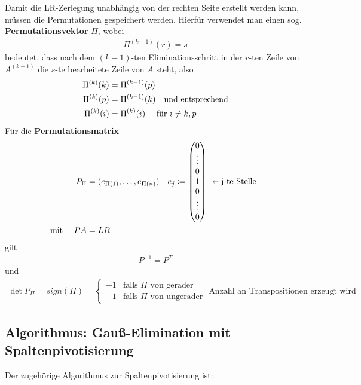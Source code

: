 \documentclass[ngerman,fontsize=11pt, paper=a4, parskip=half, titlepage=true, toc=bib]{scrbook}
\theoremstyle{definition}
\theoremstyle{plain}
\newcommand{\subsectione}[1]{\addtocounter{Def}{1}\subsection{#1}}
\begin{document}
Damit die LR-Zerlegung unabhängig von der rechten Seite erstellt werden kann, müssen die Permutationen gespeichert werden.
Hierfür verwendet man  einen sog. \textbf{Permutationsvektor} $\Pi$, wobei
\begin{gather*}
  \Pi^{(k-1)}(r) = s
\end{gather*}
bedeutet, dass nach dem $(k-1)$-ten Eliminationsschritt in der $r$-ten Zeile
von $A^{(k-1)}$ die $s$-te bearbeitete Zeile von $A$ steht, also
\begin{align*}
  \Pi^{(k)}(k) &= \Pi^{(k-1)}(p) \\
  \Pi^{(k)}(p) &= \Pi^{(k-1)}(k)  \quad \text{und entsprechend} \\
  \scriptsize \Pi^{(k)} (i) &= \Pi^{(k)} (i) \quad \text{ für }  i\neq k,p 
\end{align*}
Für die \textbf{Permutationsmatrix}  
\begin{align*}
  P_{\Pi}&=(e_{\Pi(1)}, \dots , e_{\Pi(n)}) 
  &&
     e_j\coloneqq \begin{pmatrix}
       0\\\vdots\\0\\
       1 \\
       0\\\vdots\\0 
     \end{pmatrix}
  \begin{array}{l}
    \\\\
    \shortleftarrow \text{j-te Stelle}\\
    \\\\
  \end{array} \\
  \text{mit }	\quad PA&= LR
\end{align*}
gilt
\begin{gather*}
  P^{-1} = P^T
\end{gather*}
und
\begin{gather*}
  \det P_{\Pi} = sign(\Pi) =  \begin{cases}
    +1&  \text{falls }\Pi \text{ von gerader}\\
    -1 &  \text{falls } \Pi \text{ von ungerader}
  \end{cases} \text{ Anzahl an Transpositionen erzeugt wird}
\end{gather*}


\subsectione{Algorithmus: Gauß-Elimination mit Spaltenpivotisierung}\label{2.2.3}
Der zugehörige Algorithmus zur Spaltenpivotisierung ist: \\
\end{document}
